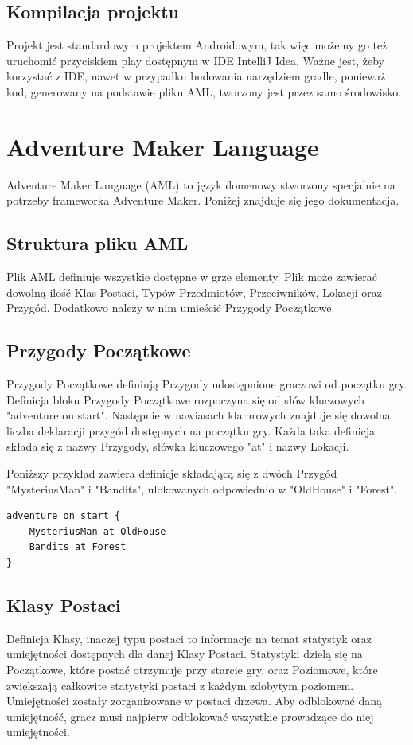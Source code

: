 \documentclass{xmgr}
\begin{document}
\section{Kompilacja projektu}
Projekt jest standardowym projektem Androidowym, tak więc możemy go też uruchomić przyciskiem play dostępnym w IDE IntelliJ Idea. Ważne jest, żeby korzystać z IDE, nawet w przypadku budowania narzędziem gradle, ponieważ kod, generowany na podstawie pliku AML, tworzony jest przez samo środowisko.

\chapter{Adventure Maker Language} 
Adventure Maker Language (AML) to język domenowy stworzony specjalnie na potrzeby frameworka Adventure Maker. Poniżej znajduje się jego dokumentacja.

\section{Struktura pliku AML} 
Plik AML definiuje wszystkie dostępne w grze elementy. Plik może zawierać dowolną ilość Klas Postaci, Typów Przedmiotów, Przeciwników, Lokacji oraz Przygód. Dodatkowo należy w nim umieścić Przygody Początkowe. 

\section{Przygody Początkowe} 
Przygody Początkowe definiują Przygody udostępnione graczowi od początku gry. Definicja bloku Przygody Początkowe rozpoczyna się od słów kluczowych "adventure on start". Następnie w nawiasach klamrowych znajduje się dowolna liczba deklaracji przygód dostępnych na początku gry.
Każda taka definicja składa się z nazwy Przygody, słówka kluczowego "at" i nazwy Lokacji.

Poniższy przykład zawiera definicje składającą się z dwóch Przygód "MysteriusMan" i "Bandits", ulokowanych odpowiednio w "OldHouse" i "Forest".

\begin{lstlisting}
adventure on start {
	MysteriusMan at OldHouse
	Bandits at Forest
}
\end{lstlisting}

\section{Klasy Postaci}
Definicja Klasy, inaczej typu postaci to informacje na temat statystyk oraz umiejętności dostępnych dla danej Klasy Postaci. Statystyki dzielą się na Początkowe, które postać otrzymuje przy starcie gry, oraz Poziomowe, które zwiększają całkowite statystyki postaci z każdym zdobytym poziomem. Umiejętności zostały zorganizowane w postaci drzewa. Aby odblokować daną umiejętność, gracz musi najpierw odblokować wszystkie prowadzące do niej umiejętności.
\end{document}
